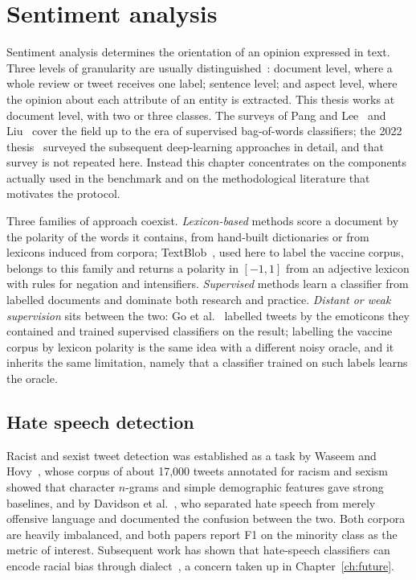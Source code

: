 \section{Sentiment analysis}
Sentiment analysis determines the orientation of an opinion expressed in text. Three levels of granularity are usually distinguished~\cite{liu2012}: document level, where a whole review or tweet receives one label; sentence level; and aspect level, where the opinion about each attribute of an entity is extracted. This thesis works at document level, with two or three classes. The surveys of Pang and Lee~\cite{pang2008} and Liu~\cite{liu2012} cover the field up to the era of supervised bag-of-words classifiers; the 2022 thesis~\cite{sium2022} surveyed the subsequent deep-learning approaches in detail, and that survey is not repeated here. Instead this chapter concentrates on the components actually used in the benchmark and on the methodological literature that motivates the protocol.

Three families of approach coexist. \emph{Lexicon-based} methods score a document by the polarity of the words it contains, from hand-built dictionaries or from lexicons induced from corpora; TextBlob~\cite{loria2018}, used here to label the vaccine corpus, belongs to this family and returns a polarity in $[-1, 1]$ from an adjective lexicon with rules for negation and intensifiers. \emph{Supervised} methods learn a classifier from labelled documents and dominate both research and practice. \emph{Distant or weak supervision} sits between the two: Go et al.~\cite{go2009} labelled tweets by the emoticons they contained and trained supervised classifiers on the result; labelling the vaccine corpus by lexicon polarity is the same idea with a different noisy oracle, and it inherits the same limitation, namely that a classifier trained on such labels learns the oracle.

\subsection{Hate speech detection}
Racist and sexist tweet detection was established as a task by Waseem and Hovy~\cite{waseem2016}, whose corpus of about 17,000 tweets annotated for racism and sexism showed that character $n$-grams and simple demographic features gave strong baselines, and by Davidson et al.~\cite{davidson2017}, who separated hate speech from merely offensive language and documented the confusion between the two. Both corpora are heavily imbalanced, and both papers report F1 on the minority class as the metric of interest. Subsequent work has shown that hate-speech classifiers can encode racial bias through dialect~\cite{sap2019}, a concern taken up in Chapter~\ref{ch:future}.

